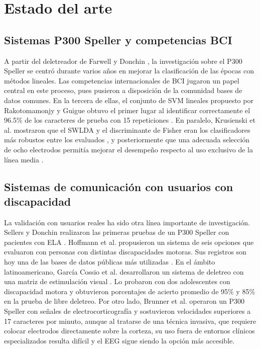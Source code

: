\section[ESTADO DEL ARTE]{Estado del arte}

\subsection{Sistemas P300 Speller y competencias BCI}

A partir del deletreador de Farwell y Donchin \cite{farwell1988}, la investigación sobre el P300
Speller se centró durante varios años en mejorar la clasificación de las épocas con métodos
lineales. Las competencias internacionales de BCI jugaron un papel central en este proceso, pues
pusieron a disposición de la comunidad bases de datos comunes. En la tercera de ellas, el conjunto
de SVM lineales propuesto por Rakotomamonjy y Guigue obtuvo el primer lugar al identificar
correctamente el 96.5\% de los caracteres de prueba con 15 repeticiones \cite{rakotomamonjy2008}.
En paralelo, Krusienski et al. mostraron que el SWLDA y el discriminante de Fisher eran los
clasificadores más robustos entre los evaluados \cite{krusienski2006}, y posteriormente que una
adecuada selección de ocho electrodos permitía mejorar el desempeño respecto al uso exclusivo de la
línea media \cite{krusienski2008}.

\subsection{Sistemas de comunicación con usuarios con discapacidad}

La validación con usuarios reales ha sido otra línea importante de investigación. Sellers y
Donchin realizaron las primeras pruebas de un P300 Speller con pacientes con ELA
\cite{sellers2006}. Hoffmann et al. propusieron un sistema de seis opciones que evaluaron con
personas con distintas discapacidades motoras. Sus registros son hoy una de las bases de datos
públicas más utilizadas \cite{hoffmann2008}. En el ámbito latinoamericano, García Cossio et al.
desarrollaron un sistema de deletreo con una matriz de estimulación visual \cite{garciacossio2011}.
Lo probaron con dos adolescentes con discapacidad motora y obtuvieron porcentajes de acierto
promedio de 95\% y 85\% en la prueba de libre deletreo. Por otro lado, Brunner et
al. \cite{brunner2011} operaron un P300 Speller con señales de electrocorticografía y sostuvieron
velocidades superiores a 17 caracteres por minuto, aunque al tratarse de una técnica invasiva, que
requiere colocar electrodos directamente sobre la corteza, su uso fuera de entornos clínicos
especializados resulta difícil y el EEG sigue siendo la opción más accesible.

